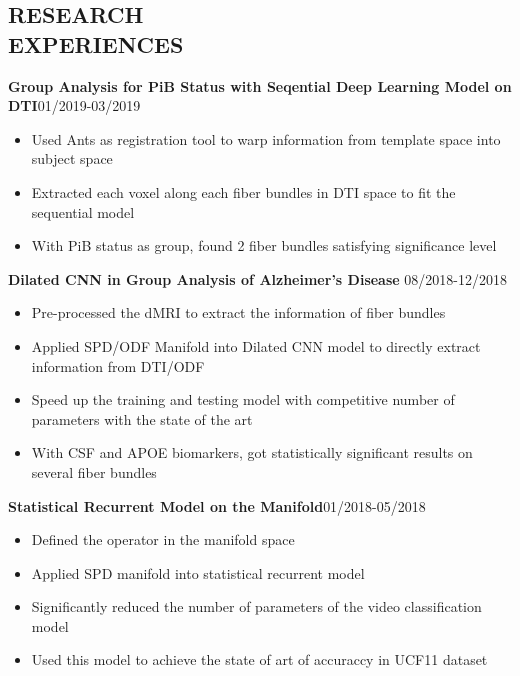 \documentclass[margin]{res}
\begin{document}
\begin{resume}
\section{RESEARCH \\ EXPERIENCES}

                \textbf{Group Analysis for PiB Status with Seqential Deep Learning Model on DTI}\hfill 01/2019-03/2019
                \begin{itemize}\itemsep -2.2pt %
                 \item Used Ants as registration tool to warp information from template space into subject space 
                 \item Extracted each voxel along each fiber bundles in DTI space to fit the sequential model
                 \item With PiB status as group, found 2 fiber bundles satisfying significance level
                 \end{itemize}

                \textbf{Dilated CNN in Group Analysis of Alzheimer's Disease} \hfill 08/2018-12/2018
                \begin{itemize}\itemsep -2.2pt %
                 \item Pre-processed the dMRI to extract the information of fiber bundles
                 \item Applied SPD/ODF Manifold into Dilated CNN model to directly extract information from DTI/ODF
                 \item Speed up the training and testing model with competitive number of parameters with the state of the art 
                 \item With CSF and APOE biomarkers, got statistically signiﬁcant results on several fiber bundles
                 \end{itemize}

                 \textbf{Statistical Recurrent Model on the Manifold}\hfill 01/2018-05/2018
                \begin{itemize}\itemsep -2.2pt %
                 \item Defined the operator in the manifold space
                 \item Applied SPD manifold into statistical recurrent model
                 \item Significantly reduced the number of parameters of the video classification model
                 \item Used this model to achieve the state of art of accuraccy in UCF11 dataset
                 \end{itemize}


\end{resume}
\end{document}
